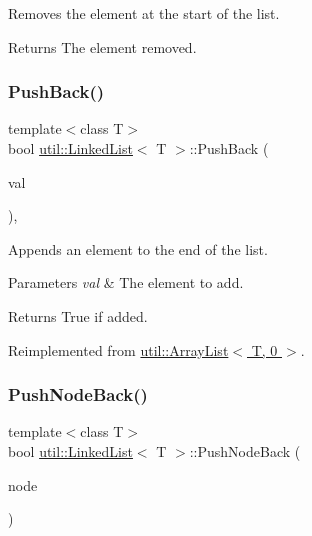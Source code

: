 Removes the element at the start of the list. 

\begin{DoxyReturn}{Returns}
The element removed. 
\end{DoxyReturn}
\mbox{\label{classutil_1_1LinkedList_a4ef3d2a7e381d968d45605c87ef88f47}} 
\subsubsection{\texorpdfstring{Push\+Back()}{PushBack()}}
{\footnotesize\ttfamily template$<$class T$>$ \\
bool \hyperlink{classutil_1_1LinkedList}{util\+::\+Linked\+List}$<$ T $>$\+::Push\+Back (\begin{DoxyParamCaption}\item[{T}]{val }\end{DoxyParamCaption})\hspace{0.3cm}{\ttfamily [inline]}, {\ttfamily [virtual]}}



Appends an element to the end of the list. 


\begin{DoxyParams}{Parameters}
{\em val} & The element to add. \\
\hline
\end{DoxyParams}
\begin{DoxyReturn}{Returns}
True if added. 
\end{DoxyReturn}


Reimplemented from \hyperlink{classutil_1_1ArrayList_a75e2f1682ebe7a982b6fd301d416d536}{util\+::\+Array\+List$<$ T, 0 $>$}.

\mbox{\label{classutil_1_1LinkedList_afac5b9fc8305e19fa4ebdeb8a2d74e1c}} 
\subsubsection{\texorpdfstring{Push\+Node\+Back()}{PushNodeBack()}}
{\footnotesize\ttfamily template$<$class T$>$ \\
bool \hyperlink{classutil_1_1LinkedList}{util\+::\+Linked\+List}$<$ T $>$\+::Push\+Node\+Back (\begin{DoxyParamCaption}\item[{\hyperlink{classutil_1_1LinkedListNode}{Linked\+List\+Node}$<$ T $>$ $\ast$}]{node }\end{DoxyParamCaption})\hspace{0.3cm}{\ttfamily [inline]}}



